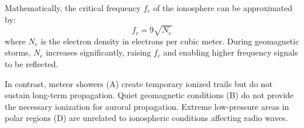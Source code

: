 Mathematically, the critical frequency \( f_c \) of the ionosphere can be approximated by:
\[
f_c = 9 \sqrt{N_e}
\]
where \( N_e \) is the electron density in electrons per cubic meter. During geomagnetic storms, \( N_e \) increases significantly, raising \( f_c \) and enabling higher frequency signals to be reflected.

In contrast, meteor showers (A) create temporary ionized trails but do not sustain long-term propagation. Quiet geomagnetic conditions (B) do not provide the necessary ionization for auroral propagation. Extreme low-pressure areas in polar regions (D) are unrelated to ionospheric conditions affecting radio waves.

